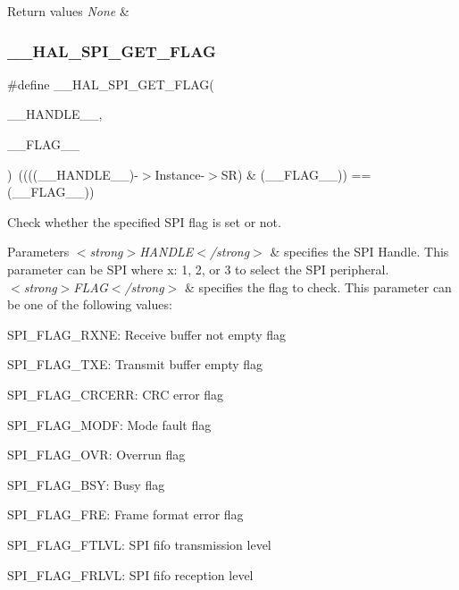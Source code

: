 \begin{DoxyRetVals}{Return values}
{\em None} & \\
\hline
\end{DoxyRetVals}
\mbox{\label{group___s_p_i___exported___macros_gaa0bbe5fb55f93fd277ddb6acf58cec53}} 
\subsubsection{\texorpdfstring{\_\_HAL\_SPI\_GET\_FLAG}{\_\_HAL\_SPI\_GET\_FLAG}}
{\footnotesize\ttfamily \#define \+\_\+\+\_\+\+H\+A\+L\+\_\+\+S\+P\+I\+\_\+\+G\+E\+T\+\_\+\+F\+L\+AG(\begin{DoxyParamCaption}\item[{}]{\+\_\+\+\_\+\+H\+A\+N\+D\+L\+E\+\_\+\+\_\+,  }\item[{}]{\+\_\+\+\_\+\+F\+L\+A\+G\+\_\+\+\_\+ }\end{DoxyParamCaption})~((((\+\_\+\+\_\+\+H\+A\+N\+D\+L\+E\+\_\+\+\_\+)-\/$>$Instance-\/$>$SR) \& (\+\_\+\+\_\+\+F\+L\+A\+G\+\_\+\+\_\+)) == (\+\_\+\+\_\+\+F\+L\+A\+G\+\_\+\+\_\+))}



Check whether the specified S\+PI flag is set or not. 


\begin{DoxyParams}{Parameters}
{\em $<$strong$>$\+H\+A\+N\+D\+L\+E$<$/strong$>$} & specifies the S\+PI Handle. This parameter can be S\+PI where x\+: 1, 2, or 3 to select the S\+PI peripheral. \\
\hline
{\em $<$strong$>$\+F\+L\+A\+G$<$/strong$>$} & specifies the flag to check. This parameter can be one of the following values\+: \begin{DoxyItemize}
\item S\+P\+I\+\_\+\+F\+L\+A\+G\+\_\+\+R\+X\+NE\+: Receive buffer not empty flag \item S\+P\+I\+\_\+\+F\+L\+A\+G\+\_\+\+T\+XE\+: Transmit buffer empty flag \item S\+P\+I\+\_\+\+F\+L\+A\+G\+\_\+\+C\+R\+C\+E\+RR\+: C\+RC error flag \item S\+P\+I\+\_\+\+F\+L\+A\+G\+\_\+\+M\+O\+DF\+: Mode fault flag \item S\+P\+I\+\_\+\+F\+L\+A\+G\+\_\+\+O\+VR\+: Overrun flag \item S\+P\+I\+\_\+\+F\+L\+A\+G\+\_\+\+B\+SY\+: Busy flag \item S\+P\+I\+\_\+\+F\+L\+A\+G\+\_\+\+F\+RE\+: Frame format error flag \item S\+P\+I\+\_\+\+F\+L\+A\+G\+\_\+\+F\+T\+L\+VL\+: S\+PI fifo transmission level \item S\+P\+I\+\_\+\+F\+L\+A\+G\+\_\+\+F\+R\+L\+VL\+: S\+PI fifo reception level \end{DoxyItemize}
\\
\hline
\end{DoxyParams}

